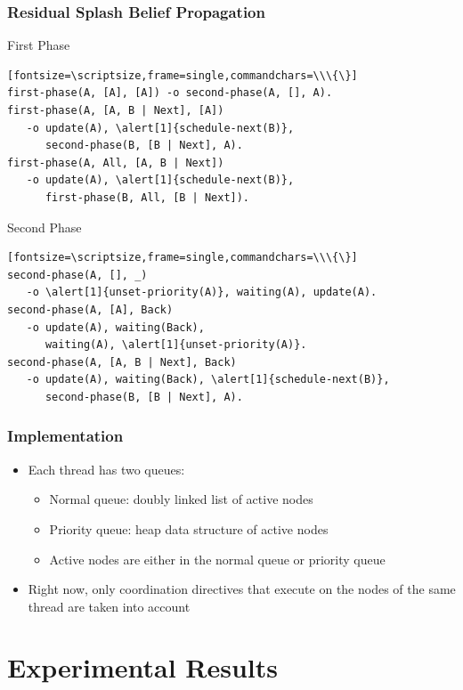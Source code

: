 \documentclass{beamer}
\let\oldalert\alert
\renewcommand{\alert}[2][]{%
  \if\relax\detokenize{#1}\relax%
    \oldalert{#2}%
  \else
    \oldalert<#1>{#2}%
  \fi}
\begin{document}
\begin{frame}[fragile]
   \frametitle{Residual Splash Belief Propagation}
   \begin{block}{First Phase}
   \begin{verbatim}[fontsize=\scriptsize,frame=single,commandchars=\\\{\}]
first-phase(A, [A], [A]) -o second-phase(A, [], A).
first-phase(A, [A, B | Next], [A])
   -o update(A), \alert[1]{schedule-next(B)},
      second-phase(B, [B | Next], A).
first-phase(A, All, [A, B | Next])
   -o update(A), \alert[1]{schedule-next(B)},
      first-phase(B, All, [B | Next]).
   \end{verbatim}
\end{block}
   \begin{block}{Second Phase}
   \begin{verbatim}[fontsize=\scriptsize,frame=single,commandchars=\\\{\}]
second-phase(A, [], _)
   -o \alert[1]{unset-priority(A)}, waiting(A), update(A).
second-phase(A, [A], Back)
   -o update(A), waiting(Back),
      waiting(A), \alert[1]{unset-priority(A)}.
second-phase(A, [A, B | Next], Back)
   -o update(A), waiting(Back), \alert[1]{schedule-next(B)},
      second-phase(B, [B | Next], A).
   \end{verbatim}
\end{block}
\end{frame}

\begin{frame}[fragile]
   \frametitle{Implementation}
   \begin{itemize}
      \item Each thread has two queues:
      \begin{itemize}
         \item Normal queue: doubly linked list of active nodes
         \item Priority queue: heap data structure of active nodes
         \item Active nodes are either in the normal queue or priority queue
      \end{itemize}
      \item Right now, only coordination directives that execute on the nodes of the same thread are taken into account
   \end{itemize}
\end{frame}

\section{Experimental Results}
\end{document}
